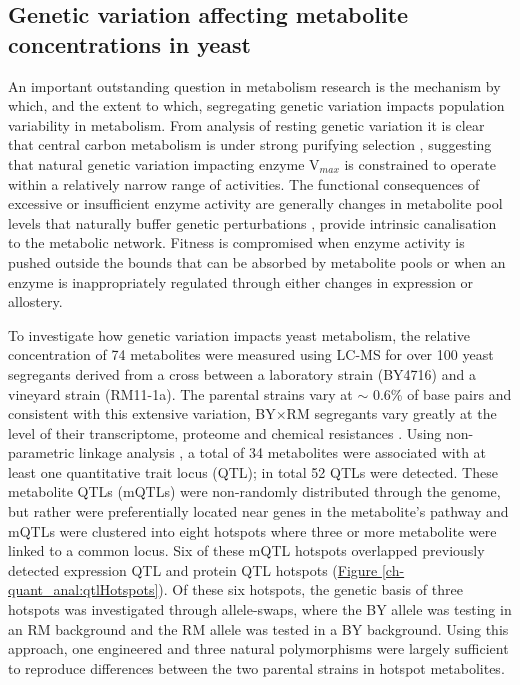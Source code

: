 \subsection{Genetic variation affecting metabolite concentrations in yeast}

An important outstanding question in metabolism research is the mechanism by which, and the extent to which, segregating genetic variation impacts population variability in metabolism.  From analysis of resting genetic variation it is clear that central carbon metabolism is under strong purifying selection \cite{Greenberg:2008uy}, suggesting that natural genetic variation impacting enzyme V$_{max}$ is constrained to operate within a relatively narrow range of activities. The functional consequences of excessive or insufficient enzyme activity are generally changes in metabolite pool levels that naturally buffer genetic perturbations \cite{Fendt:2010gr}, provide intrinsic canalisation to the metabolic network. Fitness is compromised when enzyme activity is pushed outside the bounds that can be absorbed by metabolite pools or when an enzyme is inappropriately regulated through either changes in expression or allostery. 

To investigate how genetic variation impacts yeast metabolism, the relative concentration of 74 metabolites were measured using LC-MS for over 100 yeast segregants derived from a cross between a laboratory strain (BY4716) and a vineyard strain (RM11-1a). The parental strains vary at $\sim$ 0.6\% of base pairs and consistent with this extensive variation, BY$\times$RM segregants vary greatly at the level of their transcriptome, proteome and chemical resistances \cite{Brem:2005gh, Foss:2007ej, Bloom:2013bq}. Using non-parametric linkage analysis \cite{Broman:2003wq}, a total of 34 metabolites were associated with at least one quantitative trait locus (QTL); in total 52 QTLs were detected.  These metabolite QTLs (mQTLs) were non-randomly distributed through the genome, but rather were preferentially located near genes in the metabolite's pathway and mQTLs were clustered into eight hotspots where three or more metabolite were linked to a common locus. Six of these mQTL hotspots overlapped previously detected expression QTL and protein QTL hotspots (\hyperref[ch-quant_anal:qtlHotspots]{Figure \ref{ch-quant_anal:qtlHotspots}}). Of these six hotspots, the genetic basis of three hotspots was investigated through allele-swaps, where the BY allele was testing in an RM background and the RM allele was tested in a BY background. Using this approach, one engineered and three natural polymorphisms were largely sufficient to reproduce differences between the two parental strains in hotspot metabolites. 

